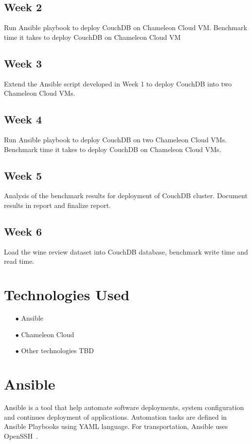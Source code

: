 \subsection{Week 2}

Run Ansible playbook to deploy CouchDB on Chameleon Cloud
VM. Benchmark time it takes to deploy CouchDB on Chameleon Cloud VM

\subsection{Week 3}

Extend the Ansible script developed in Week 1 to deploy CouchDB into
two Chameleon Cloud VMs.

\subsection{Week 4}

Run Ansible playbook to deploy CouchDB on two Chameleon Cloud
VMs. Benchmark time it takes to deploy CouchDB on Chameleon Cloud VMs.

\subsection{Week 5}

Analysis of the benchmark results for deployment of CouchDB
cluster. Document results in report and finalize report.

\subsection{Week 6}

Load the wine review dataset into CouchDB database, benchmark write time
and read time. 



\section{Technologies Used}

\begin{itemize}
\item[$\bullet$] Ansible
\item[$\bullet$] Chameleon Cloud
\item[$\bullet$] Other technologies TBD
\end{itemize}
\section{Ansible}
Ansible is a tool that help automate software deployments, system
configuration and continues deployment of applications. Automation
tasks are defined in Ansible Playbooks using YAML language. For
transportation, Ansible uses OpenSSH~\cite{www-Ansible}. 

